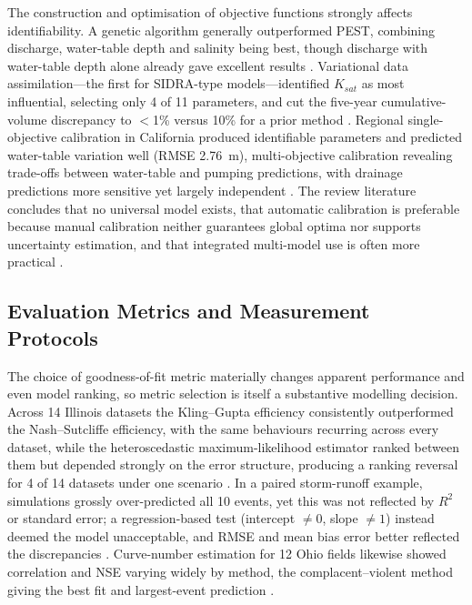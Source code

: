 The construction and optimisation of objective functions strongly affects identifiability. A genetic algorithm generally outperformed PEST, combining discharge, water-table depth and salinity being best, though discharge with water-table depth alone already gave excellent results \parencite{Sedaghatdoost2019}. Variational data assimilation---the first for SIDRA-type models---identified $K_{sat}$ as most influential, selecting only 4 of 11 parameters, and cut the five-year cumulative-volume discrepancy to $<$1\% versus 10\% for a prior method \parencite{Chelil2022b}. Regional single-objective calibration in California produced identifiable parameters and predicted water-table variation well (RMSE 2.76~m), multi-objective calibration revealing trade-offs between water-table and pumping predictions, with drainage predictions more sensitive yet largely independent \parencite{Schoups2005}. The review literature concludes that no universal model exists, that automatic calibration is preferable because manual calibration neither guarantees global optima nor supports uncertainty estimation, and that integrated multi-model use is often more practical \parencite{Singh2019b}.

\subsection{Evaluation Metrics and Measurement Protocols}

The choice of goodness-of-fit metric materially changes apparent performance and even model ranking, so metric selection is itself a substantive modelling decision. Across 14 Illinois datasets the Kling--Gupta efficiency consistently outperformed the Nash--Sutcliffe efficiency, with the same behaviours recurring across every dataset, while the heteroscedastic maximum-likelihood estimator ranked between them but depended strongly on the error structure, producing a ranking reversal for 4 of 14 datasets under one scenario \parencite{Bruhn2025}. In a paired storm-runoff example, simulations grossly over-predicted all 10 events, yet this was not reflected by $R^2$ or standard error; a regression-based test (intercept $\ne0$, slope $\ne1$) instead deemed the model unacceptable, and RMSE and mean bias error better reflected the discrepancies \parencite{STONE1995,SAVABI1995}. Curve-number estimation for 12 Ohio fields likewise showed correlation and NSE varying widely by method, the complacent--violent method giving the best fit and largest-event prediction \parencite{Wessel2022}.

